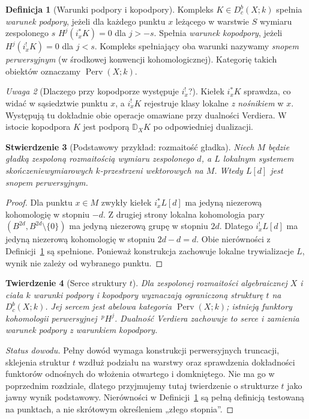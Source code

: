 \documentclass[11pt,a4paper,oneside]{report}
\theoremstyle{plain}
\newtheorem{twierdzenie}{Twierdzenie}[section]
\newtheorem{stwierdzenie}[twierdzenie]{Stwierdzenie}
\theoremstyle{definition}
\newtheorem{definicja}[twierdzenie]{Definicja}
\theoremstyle{remark}
\newtheorem{uwaga}[twierdzenie]{Uwaga}
\begin{document}
\begin{definicja}[Warunki podpory i kopodpory]
\label{def:perverse-support-xiii}
Kompleks $K\in D_c^b(X;k)$ spełnia
\emph{warunek podpory}, jeżeli dla każdego punktu $x$
leżącego w warstwie $S$ wymiaru zespolonego $s$
$H^j(i_x^*K)=0$ dla $j>-s$.
Spełnia \emph{warunek kopodpory}, jeżeli
$H^j(i_x^!K)=0$ dla $j<s$.
Kompleks spełniający oba warunki nazywamy
\emph{snopem perwersyjnym} (w środkowej konwencji
kohomologicznej). Kategorię takich obiektów oznaczamy
$\operatorname{Perv}(X;k)$.
\end{definicja}
\begin{uwaga}[Dlaczego przy kopodporze występuje $i_x^!$?]
Kiełek $i_x^*K$ sprawdza, co widać w sąsiedztwie
punktu $x$, a $i_x^!K$ rejestruje klasy lokalne
\emph{z nośnikiem} w $x$. Występują tu dokładnie
obie operacje omawiane przy dualności Verdiera.
W istocie kopodpora $K$ jest podporą
$\mathbb D_XK$ po odpowiedniej dualizacji.
\end{uwaga}

\begin{stwierdzenie}[Podstawowy przykład: rozmaitość gładka]
\label{prop:smooth-perverse-xiii}
Niech $M$ będzie gładką zespoloną rozmaitością
wymiaru zespolonego $d$, a $L$ lokalnym systemem
skończeniewymiarowych $k$-przestrzeni wektorowych
na $M$. Wtedy $L[d]$ jest snopem perwersyjnym.
\end{stwierdzenie}
\begin{proof}
Dla punktu $x\in M$ zwykły kiełek $i_x^*L[d]$
ma jedyną niezerową kohomologię w stopniu $-d$.
Z drugiej strony lokalna kohomologia pary
$(B^{2d},B^{2d}\setminus\{0\})$ ma jedyną niezerową
grupę w stopniu $2d$. Dlatego $i_x^!L[d]$
ma jedyną niezerową kohomologię w stopniu
$2d-d=d$. Obie nierówności z
Definicji~\ref{def:perverse-support-xiii}
są spełnione. Ponieważ konstrukcja zachowuje
lokalne trywializacje $L$, wynik nie zależy od
wybranego punktu.
\end{proof}

\begin{twierdzenie}[Serce struktury $t$]
\label{thm:heart-perverse-xiii}
Dla zespolonej rozmaitości algebraicznej $X$
i ciała $k$ warunki podpory i kopodpory wyznaczają
ograniczoną strukturę $t$ na $D_c^b(X;k)$.
Jej sercem jest abelowa kategoria
$\operatorname{Perv}(X;k)$; istnieją funktory
kohomologii perwersyjnej $\,{}^p\!H^j$.
Dualność Verdiera zachowuje to serce i zamienia
warunek podpory z warunkiem kopodpory.
\end{twierdzenie}
\begin{proof}[Status dowodu]
Pełny dowód wymaga konstrukcji perwersyjnych
truncacji, sklejenia struktur $t$ wzdłuż podziału
na warstwy oraz sprawdzenia dokładności funktorów
odnośnych do włożenia otwartego i domkniętego.
Nie ma go w poprzednim rozdziale, dlatego
przyjmujemy tutaj twierdzenie o strukturze $t$
jako jawny wynik podstawowy. Nierówności w
Definicji~\ref{def:perverse-support-xiii}
są pełną definicją testowaną na punktach,
a nie skrótowym określeniem „złego stopnia”.
\end{proof}
\end{document}
